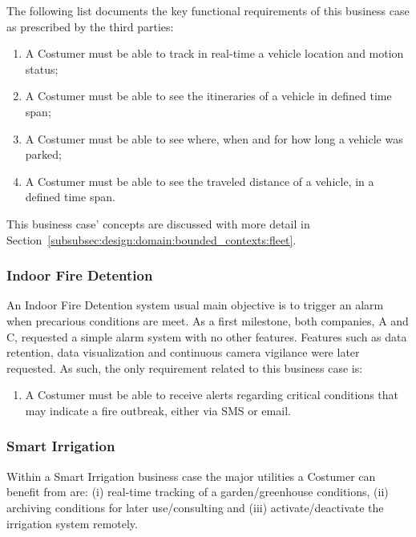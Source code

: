 The following list documents the key functional requirements of this business case as prescribed by the third parties:

\begin{enumerate}
    \item A Costumer must be able to track in real-time a vehicle location and motion status;
    \item A Costumer must be able to see the itineraries of a vehicle in defined time span;
    \item A Costumer must be able to see where, when and for how long a vehicle was parked;
    \item A Costumer must be able to see the traveled distance of a vehicle, in a defined time span.
\end{enumerate}

This business case' concepts are discussed with more detail in Section~\ref{subsubsec:design:domain:bounded_contexts:fleet}.

\subsubsection{Indoor Fire Detention}
\label{subsubsec:requirements:functional:services:fire}

An Indoor Fire Detention system usual main objective is to trigger an alarm when precarious conditions are meet. As a first milestone, both companies, A and C, requested a simple alarm system with no other features. Features such as data retention, data visualization and continuous camera vigilance were later requested. As such, the only requirement related to this business case is:

\begin{enumerate}
    \item A Costumer must be able to receive alerts regarding critical conditions that may indicate a fire outbreak, either via SMS or email.
\end{enumerate}

\subsubsection{Smart Irrigation}
\label{subsubsec:requirements:functional:services:irrigation}

Within a Smart Irrigation business case the major utilities a Costumer can benefit from are: (i) real-time tracking of a garden/greenhouse conditions, (ii) archiving conditions for later use/consulting and (iii) activate/deactivate the irrigation system remotely.


